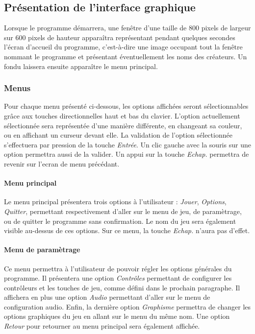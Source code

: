\subsection{Présentation de l'interface graphique}

Lorsque le programme démarrera, une fenêtre d'une taille de 800 pixels de largeur sur 600 pixels de hauteur apparaîtra représentant pendant quelques secondes l'écran d'accueil du programme, c'est-à-dire une image occupant tout la fenêtre nommant le programme et présentant éventuellement les noms des créateurs. Un fondu laissera ensuite apparaître le menu principal.

\subsubsection{Menus}

Pour chaque menu présenté ci-dessous, les options affichées seront sélectionnables grâce aux touches directionnelles haut et bas du clavier. L'option  actuellement sélectionnée sera représentée d'une manière différente, en changeant sa couleur, ou en affichant un curseur devant elle. La validation de l'option sélectionnée s'effectuera par pression de la touche \emph{Entrée}. Un clic gauche avec la souris sur une option permettra aussi de la valider. Un appui sur la touche \emph{Echap.} permettra de revenir sur l'ecran de menu précédant.

\paragraph{Menu principal}

Le menu principal présentera trois options à l'utilisateur : \emph{Jouer}, \emph{Options}, \emph{Quitter}, permettant respectivement d'aller sur le menu de jeu, de paramètrage, ou de quitter le programme sans confirmation. Le nom du jeu sera également visible au-dessus de ces options. Sur ce menu, la touche \emph{Echap.} n'aura pas d'effet.

\paragraph{Menu de paramètrage}

Ce menu permettra à l'utilisateur de pouvoir régler les options générales du programme. Il présentera une option \emph{Contrôles} permettant de configurer les contrôleurs et les touches de jeu, comme défini dans le prochain paragraphe. Il affichera en plus une option \emph{Audio} permettant d'aller sur le menu de configuration audio. Enfin, la dernière option \emph{Graphisme} permettra de changer les options graphiques du jeu en allant sur le menu du même nom. Une option \emph{Retour} pour retourner au menu principal sera également affichée.

